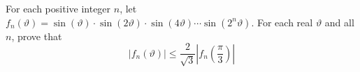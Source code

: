 For each positive integer $n$, let $f_{n}(\vartheta)=\sin(\vartheta)\cdot \sin(2\vartheta) \cdot \sin(4\vartheta)\cdots \sin(2^{n}\vartheta)$.
For each real $\vartheta$ and all $n$, prove that
\[|f_{n}(\vartheta)| \leq \frac{2}{\sqrt{3}}|f_{n}(\frac{\pi}{3})| \]